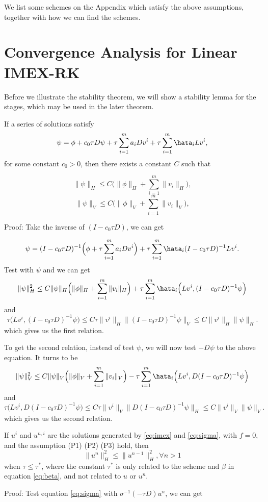 We list some schemes on the Appendix which satisfy the above assumptions, 
together with how we can find the schemes. 





\section{Convergence Analysis for Linear IMEX-RK}\label{sec:convergence}

Before we illustrate the stability theorem, we will show a stability lemma for the stages, which may be used in the later theorem.
\begin{lemma}\label{thm:Stages}
    If a series of solutions satisfy
    $$\psi = \phi + c_0 \tau D\psi + \tau \sum\limits_{i=1}^{m}a_{i}Dv^i + \tau \sum\limits_{i=1}^{m}\hata_{i}Lv^{i},$$
    for some constant $c_0>0$, then there exists a constant $C$ such that

    $$\|\psi\|_H \leq C\Big( \|\phi\|_H + \sum_{i=1}^m \|v_i\|_H \Big),$$
    $$\|\psi\|_V \leq C\Big( \|\phi\|_V + \sum_{i=1}^m \|v_i\|_V \Big),$$
\end{lemma}
Proof: Take the inverse of $(I - c_0 \tau D)$, we can get

$$\psi = (I - c_0 \tau D)^{-1}\Big(\phi + \tau \sum\limits_{i=1}^{m}a_{i}Dv^i\Big) + \tau \sum\limits_{i=1}^{m}\hata_{i}(I - c_0 \tau D)^{-1}Lv^{i}.$$
Test with $\psi$ and we can get
$$\|\psi\|_H^2 \leq C\|\psi\|_H\Big(\|\phi\|_H + \sum_{i=1}^m \|v_i\|_H\Big) + \tau \sum\limits_{i=1}^{m} \hata_i\Big(Lv^{i}, (I - c_0 \tau D)^{-1} \psi\Big)$$
and
$$\tau \Big(Lv^{i}, (I - c_0 \tau D)^{-1} \psi\Big) \leq C \tau \|v^i\|_H \|(I - c_0 \tau D)^{-1} \psi\|_V \leq C \|v^i\|_H \|\psi\|_H.$$
which gives us the first relation.

To get the second relation, instead of test $\psi$, we will now test $-D\psi$ to the above equation. It turns to be
$$\|\psi\|_V^2 \leq C\|\psi\|_V\Big(\|\phi\|_V + \sum_{i=1}^m \|v_i\|_V\Big) - \tau \sum\limits_{i=1}^{m} \hata_i\Big(Lv^{i}, D(I - c_0 \tau D)^{-1} \psi\Big)$$
and
$$\tau \Big(Lv^{i}, D(I - c_0 \tau D)^{-1} \psi\Big) \leq  C\tau \|v^i\|_V \|D(I - c_0 \tau D)^{-1} \psi\|_H \leq C \|v^i\|_V \|\psi\|_V.$$
which gives us the second relation.

\begin{theorem}\label{thm:Stable}
    If $u^i$ and $u^{n,i}$ are the solutions generated by \ref{eq:imex} and \ref{eq:sigma},
    with $f=0$, and the assumption (P1) (P2) (P3) hold,
    then
    $$\|u^n\|_H^2  \leq \|u^{n-1}\|_H^2 , \forall n>1$$
    when $\tau \leq \tau^*$, 
    where the constant $\tau^*$ is only 
    related to the scheme and $\beta$ in equation \eqref{eq:beta}, 
    and not related to $u$ or $u^n$.
\end{theorem}
Proof: Test equation \ref{eq:sigma} with $\sigma^{-1}(-\tau D)u^n$, we can get

